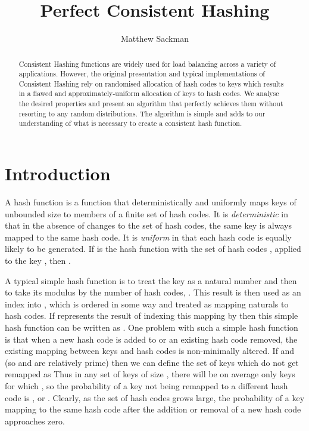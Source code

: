 \documentclass[runningheads,a4paper]{llncs}
\begin{document}
\mainmatter

\title{Perfect Consistent Hashing}

\author{Matthew Sackman\\}
\institute{}
\maketitle

\begin{abstract}
Consistent Hashing functions are widely used for load balancing across
a variety of applications. However, the original presentation and
typical implementations of Consistent Hashing rely on randomised
allocation of hash codes to keys which results in a flawed and
approximately-uniform allocation of keys to hash codes. We analyse the
desired properties and present an algorithm that perfectly achieves
them without resorting to any random distributions. The algorithm is
simple and adds to our understanding of what is necessary to create a
consistent hash function.
\end{abstract}


\section{Introduction}

A hash function is a function that deterministically and uniformly
maps keys of unbounded size to members of a finite set of hash
codes. It is {\em deterministic} in that in the absence of changes to
the set of hash codes, the same key is always mapped to the same hash
code. It is {\em uniform} in that each hash code is equally likely to
be generated. If  is the hash function  with the set
of hash codes , applied to the key , then .

A typical simple hash function is to treat the key as a natural number
and then to take its modulus by the number of hash codes, . This
result is then used as an index into , which is ordered in some way
and treated as mapping naturals to hash codes. If  represents
the result of indexing this mapping  by  then this simple hash
function can be written as . One
problem with such a simple hash function is that when a new hash code
is added to  or an existing hash code removed, the existing mapping
between keys and hash codes is non-minimally altered. If  and  (so  and  are relatively prime)
then we can define the set of keys which do not get remapped as
 Thus
in any set of keys of size , there will be on average
only  keys for which , so the
probability of a key not being remapped to a different hash code is
, or . Clearly, as
the set of hash codes grows large, the probability of a key mapping to
the same hash code after the addition or removal of a new hash code
approaches zero.
\end{document}
